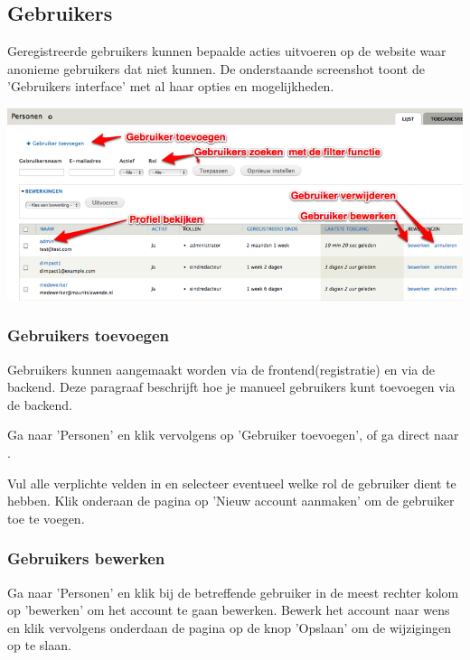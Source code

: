 \subsection{Gebruikers}

Geregistreerde gebruikers kunnen bepaalde acties uitvoeren op de website waar anonieme gebruikers dat niet kunnen. 
De onderstaande screenshot toont de 'Gebruikers interface' met al haar opties en mogelijkheden.

\bigskip

\begin{center}
	\includegraphics[width=\textwidth]{img/gebruikers1.png}
\end{center}

\subsubsection{Gebruikers toevoegen}

Gebruikers kunnen aangemaakt worden via de frontend(registratie) en via de backend. Deze paragraaf beschrijft hoe je manueel gebruikers kunt toevoegen via de backend. 

Ga naar 'Personen' en klik vervolgens op 'Gebruiker toevoegen', of ga direct naar .

Vul alle verplichte velden in en selecteer eventueel welke rol de gebruiker dient te hebben.
Klik onderaan de pagina op 'Nieuw account aanmaken' om de gebruiker toe te voegen.

\subsubsection{Gebruikers bewerken}

Ga naar 'Personen' en klik bij de betreffende gebruiker in de meest rechter kolom op 'bewerken' om het account te gaan bewerken. 
Bewerk het account naar wens en klik vervolgens onderdaan de pagina op de knop 'Opslaan' om de wijzigingen op te slaan.


